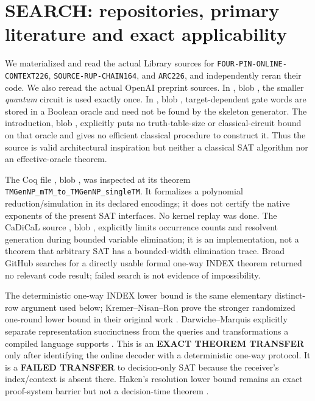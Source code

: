 \documentclass[11pt]{article}
\begin{document}
\section{SEARCH: repositories, primary literature and exact applicability}
We materialized and read the actual Library sources for
\texttt{FOUR-PIN-ONLINE-CONTEXT226}, \texttt{SOURCE-RUP-CHAIN164}, and
\texttt{ARC226}, and independently reran their code.  We also reread the actual
OpenAI preprint sources.  In
, blob
\texttt{}, the smaller
\emph{quantum} circuit is used exactly once.  In
, blob
\texttt{}, target-dependent
gate words are stored in a Boolean oracle and need not be found by the skeleton
generator.  The introduction, blob
\texttt{}, explicitly puts
no truth-table-size or classical-circuit bound on that oracle and gives no
efficient classical procedure to construct it.  Thus the source is valid
architectural inspiration but neither a classical SAT algorithm nor an
effective-oracle theorem.

The Coq file
,
blob \texttt{}, was inspected
at its theorem \texttt{TMGenNP\_mTM\_to\_TMGenNP\_singleTM}.  It formalizes a
polynomial reduction/simulation in its declared encodings; it does not certify
the native exponents of the present SAT interfaces.  No kernel replay was done.
The CaDiCaL source , blob
\texttt{}, explicitly
limits occurrence counts and resolvent generation during bounded variable
elimination; it is an implementation, not a theorem that arbitrary SAT has a
bounded-width elimination trace.  Broad GitHub searches for a directly usable
formal one-way INDEX theorem returned no relevant code result; failed search is
not evidence of impossibility.

The deterministic one-way INDEX lower bound is the same elementary distinct-row
argument used below; Kremer--Nisan--Ron prove the stronger randomized one-round
lower bound in their original work \cite{knr}.  Darwiche--Marquis explicitly
separate representation succinctness from the queries and transformations a
compiled language supports \cite{dm}.  This is an \textbf{EXACT THEOREM
TRANSFER} only after identifying the online decoder with a deterministic
one-way protocol.  It is a \textbf{FAILED TRANSFER} to decision-only SAT because
the receiver's index/context is absent there.  Haken's resolution lower bound
remains an exact proof-system barrier but not a decision-time theorem
\cite{haken}.
\end{document}
